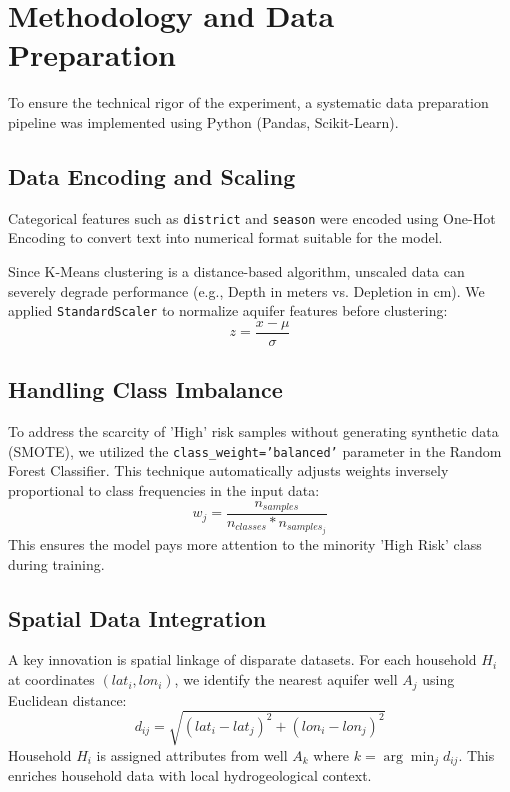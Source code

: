 \documentclass[conference]{IEEEtran}
\begin{document}
\section{Methodology and Data Preparation}
To ensure the technical rigor of the experiment, a systematic data preparation pipeline was implemented using Python (Pandas, Scikit-Learn).

\subsection{Data Encoding and Scaling}
Categorical features such as \texttt{district} and \texttt{season} were encoded using One-Hot Encoding to convert text into numerical format suitable for the model.

Since K-Means clustering is a distance-based algorithm, unscaled data can severely degrade performance (e.g., Depth in meters vs. Depletion in cm). We applied \texttt{StandardScaler} to normalize aquifer features before clustering:
\begin{equation}
z = \frac{x - \mu}{\sigma}
\end{equation}

\subsection{Handling Class Imbalance}
To address the scarcity of 'High' risk samples without generating synthetic data (SMOTE), we utilized the \texttt{class\_weight='balanced'} parameter in the Random Forest Classifier. This technique automatically adjusts weights inversely proportional to class frequencies in the input data:
\begin{equation}
w_j = \frac{n_{samples}}{n_{classes} * n_{samples_j}}
\end{equation}
This ensures the model pays more attention to the minority 'High Risk' class during training.

\subsection{Spatial Data Integration}
A key innovation is spatial linkage of disparate datasets. For each household $H_i$ at coordinates $(lat_i, lon_i)$, we identify the nearest aquifer well $A_j$ using Euclidean distance:
\begin{equation}
d_{ij} = \sqrt{(lat_i - lat_j)^2 + (lon_i - lon_j)^2}
\end{equation}
Household $H_i$ is assigned attributes from well $A_k$ where $k = \arg\min_j d_{ij}$. This enriches household data with local hydrogeological context.
\end{document}
